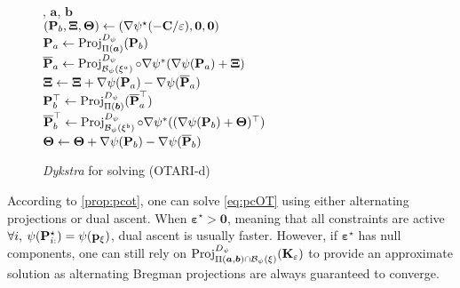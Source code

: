 \begin{wrapfigure}[18]{L}{0.52\textwidth}
  \begin{minipage}{0.52\textwidth}
\begin{algorithm}[H]
  \caption{\textit{Dykstra} for solving (OTARI-d)}
  \label{algo:Dykstra_pcot}
  \begin{algorithmic}[1]
      , $\bm{a}$, $\bm{b}$ \\
      \STATE $\left({\mathbf{P}}_b, \bm{\Xi}, \bm{\Theta} \right) \leftarrow \left(\nabla \psi^{\star}(-{\mathbf{C}} / \varepsilon), \mathbf{0}, \mathbf{0} \right)$ \\
          \STATE ${\mathbf{P}}_a \leftarrow \operatorname{Proj}^{D_\psi}_{\Pi(\bm{a})}({\mathbf{P}}_b)$ 
          \\
          \STATE $\overline{{\mathbf{P}}}_{a} \leftarrow \operatorname{Proj}^{D_\psi}_{\mathcal{B}_{\psi}(\xi^{a})}\circ \nabla \psi^*(\nabla \psi({\mathbf{P}}_a) + \bm{\Xi})$ 
          \\
          \STATE $\bm{\Xi} \leftarrow \bm{\Xi} + \nabla \psi({\mathbf{P}}_{a}) - \nabla \psi(\overline{{\mathbf{P}}}_{a})$
          \\
          \STATE ${\mathbf{P}}^\top_b \leftarrow \operatorname{Proj}^{D_\psi}_{\Pi(\bm{b})}(\overline{{\mathbf{P}}}_{a}^\top)$ 
          \\
          \STATE $\overline{{\mathbf{P}}}_{b}^\top \leftarrow \operatorname{Proj}^{D_\psi}_{\mathcal{B}_{\psi}(\xi^{b})}\circ \nabla \psi^*((\nabla \psi({\mathbf{P}}_b) + \bm{\Theta})^\top)$ 
          \\
          \STATE $\bm{\Theta} \leftarrow \bm{\Theta} + \nabla \psi({\mathbf{P}}_{b}) - \nabla \psi(\overline{{\mathbf{P}}}_{b})$
      \ENDWHILE  
\end{algorithmic}
\end{algorithm}
\end{minipage}
\end{wrapfigure}

According to \cref{prop:pcot}, one can solve \eqref{eq:pcOT} using either alternating projections or dual ascent. 
When $\bm{\varepsilon}^\star \bm{>} \bm{0}$, meaning that all constraints are active \ie $\forall i, \: \psi({\mathbf{P}}^\star_{i:}) = \psi(\mathbf{p}_{\xi})$, dual ascent is usually faster. However, if $\bm{\varepsilon}^\star$ has null components, one can still rely on $\operatorname{Proj}^{D_\psi}_{\Pi(\bm{a}, \bm{b}) \cap \mathcal{B}_\psi(\xi)}({\mathbf{K}}_\varepsilon)$ to provide an approximate solution as alternating Bregman projections are always guaranteed to converge.


